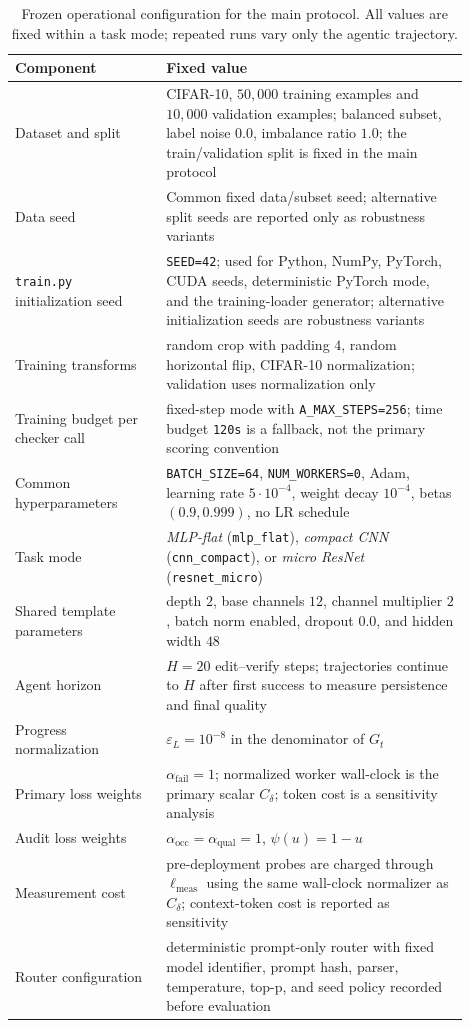\documentclass{article}
\newcommand{\eps}{\varepsilon}
\begin{document}
\begin{table}[t]
\centering
\small
\caption{Frozen operational configuration for the main protocol.
All values are fixed within a task mode; repeated runs vary only the agentic trajectory.}
\label{tab:train-config}
\begin{tabular}{@{}p{0.30\linewidth}p{0.60\linewidth}@{}}
\toprule
Component & Fixed value \\
\midrule
Dataset and split & CIFAR-10, $50{,}000$ training examples and $10{,}000$ validation examples; balanced subset, label noise $0.0$, imbalance ratio $1.0$; the train/validation split is fixed in the main protocol \\
Data seed & Common fixed data/subset seed; alternative split seeds are reported only as robustness variants \\
\texttt{train.py} initialization seed & \texttt{SEED=42}; used for Python, NumPy, PyTorch, CUDA seeds, deterministic PyTorch mode, and the training-loader generator; alternative initialization seeds are robustness variants \\
Training transforms & random crop with padding $4$, random horizontal flip, CIFAR-10 normalization; validation uses normalization only \\
Training budget per checker call & fixed-step mode with \texttt{A\_MAX\_STEPS=256}; time budget \texttt{120s} is a fallback, not the primary scoring convention \\
Common hyperparameters & \texttt{BATCH\_SIZE=64}, \texttt{NUM\_WORKERS=0}, Adam, learning rate $5\cdot 10^{-4}$, weight decay $10^{-4}$, betas $(0.9,0.999)$, no LR schedule \\
Task mode & \textit{MLP-flat} (\texttt{mlp\_flat}), \textit{compact CNN} (\texttt{cnn\_compact}), or \textit{micro ResNet} (\texttt{resnet\_micro}) \\
Shared template parameters & depth $2$, base channels $12$, channel multiplier $2$, batch norm enabled, dropout $0.0$, and hidden width $48$ \\
Agent horizon & $H=20$ edit--verify steps; trajectories continue to $H$ after first success to measure persistence and final quality \\
Progress normalization & $\eps_L=10^{-8}$ in the denominator of $G_t$ \\
Primary loss weights & $\alpha_{\mathrm{fail}}=1$; normalized worker wall-clock is the primary scalar $C_\delta$; token cost is a sensitivity analysis \\
Audit loss weights & $\alpha_{\mathrm{occ}}=\alpha_{\mathrm{qual}}=1$, $\psi(u)=1-u$ \\
Measurement cost & pre-deployment probes are charged through $\ell_{\mathrm{meas}}$ using the same wall-clock normalizer as $C_\delta$; context-token cost is reported as sensitivity \\
Router configuration & deterministic prompt-only router with fixed model identifier, prompt hash, parser, temperature, top-p, and seed policy recorded before evaluation \\
\bottomrule
\end{tabular}
\end{table}
\end{document}
